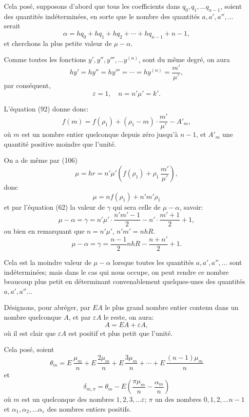 \documentclass{article}
\begin{document}
Cela posé, supposons d'abord que tous les coefficients dans $q_0, q_1, \ldots q_{n-1}$, soient des quantités indéterminées, en sorte que le nombre des quantités $a, a', a'', \ldots$ serait
\[ \alpha = hq_0+hq_1+hq_2+\cdots+hq_{n-1}+n-1, \tag{135} \]
et cherchons la plus petite valeur de $\mu-\alpha$.

Comme toutes les fonctions $y', y'', y''', \ldots y^{(n)}$, sont du même degré, on aura
\[ hy' = hy'' = hy''' = \cdots = hy^{(n)} = \frac{m'}{\mu'}, \]
par conséquent,
\[ \varepsilon = 1, \quad n = n'\mu' = k'. \]

L'équation (92) donne donc:
\[ f(m) = f(\rho_1) + (\rho_1-m) \cdot \frac{m'}{\mu'} - A'_m, \tag{136} \]
où $m$ est un nombre entier quelconque depuis zéro jusqu'à $n-1$, et $A'_m$ une quantité positive moindre que l'unité.

On a de même par (106)
\[ \mu = hr = n'\mu'\left(f(\rho_1)+\rho_1\,\frac{m'}{\mu'}\right), \]
donc
\[ \mu = nf(\rho_1) + n'm'\rho_1 \tag{137} \]
et par l'équation (62) la valeur de $\gamma$ qui sera celle de $\mu-\alpha$, savoir:
\[ \mu-\alpha = \gamma = n'\mu' \cdot \frac{n'm'-1}{2} - n' \cdot \frac{m'+1}{2} + 1, \tag{138} \]
ou bien en remarquant que $n = n'\mu'$, $n'm' = nhR$.
\[ \mu-\alpha = \gamma = \frac{n-1}{2}nhR - \frac{n+n'}{2} + 1. \tag{139} \]

Cela est la moindre valeur de $\mu-\alpha$ lorsque toutes les quantités $a, a', a'', \ldots$ sont indéterminées; mais dans le cas qui nous occupe, on peut rendre ce nombre beaucoup plus petit en déterminant convenablement quelques-unes des quantités $a, a', a'' \ldots$

Désignons, pour abréger, par $EA$ le plus grand nombre entier contenu dans un nombre quelconque $A$, et par $\varepsilon A$ le reste, on aura:
\[ A = EA + \varepsilon A, \tag{140} \]
où il est clair que $\varepsilon A$ est positif et plus petit que l'unité.

Cela posé, soient
\[ \theta_m = E\,\frac{\mu_m}{n} + E\,\frac{2\mu_m}{n} + E\,\frac{3\mu_m}{n} + \cdots + E\,\frac{(n-1)\mu_m}{n} \tag{141} \]
et
\[ \delta_{m,\pi} = \theta_m - E\left(\frac{\pi\mu_m}{n} - \frac{\alpha_m}{n}\right) \tag{142} \]
où $m$ est un quelconque des nombres $1, 2, 3, \ldots \varepsilon$; $\pi$ un des nombres $0, 1, 2, \ldots n-1$ et $\alpha_1, \alpha_2, \ldots \alpha_\varepsilon$ des nombres entiers positifs.
\end{document}
